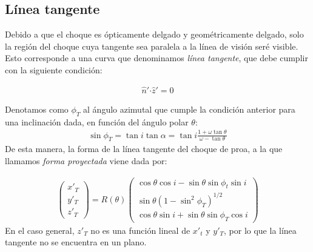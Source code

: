 \subsection{Línea tangente}

Debido a que el choque es ópticamente delgado y geométricamente
delgado, solo la región del choque cuya tangente sea paralela a la
línea de visión seré visible. Esto corresponde a una curva que
denominamos \textit{línea tangente}, que debe cumplir con la siguiente
condición:

\begin{align}
  \hat{n}'\boldsymbol{\cdot} \hat{z}' = 0
\end{align}

Denotamos como $\phi_T$ al ángulo azimutal que cumple la condición anterior
para una inclinación dada, en función del ángulo polar $\theta$:
\begin{align}
  \sin\phi_T = \tan i\tan\alpha = \tan i\frac{1+\omega\tan\theta}{\omega-\tan\theta}
  \label{eq:phi-tan}
\end{align}
De esta manera, la forma de la línea tangente del choque de proa, a la que llamamos
\textit{forma proyectada} viene dada por:

\begin{align}
  \left(
  \begin{array}{c}
    x'_T \\
    y'_T \\
    z'_T
  \end{array}
  \right) =
  R(\theta)\left(
  \begin{array}{c}
    \cos\theta\cos i - \sin\theta\sin\phi_t\sin i \\
    \sin\theta\left(1-\sin^2\phi_T\right)^{1/2} \\
    \cos\theta\sin i + \sin\theta\sin\phi_T\cos i
  \end{array}
  \right) \label{eq:proj-shape}
\end{align}
En el caso general, $z'_T$ no es una función lineal de $x'_t$ y $y'_T$, por lo que
la línea tangente no se encuentra en un plano.

